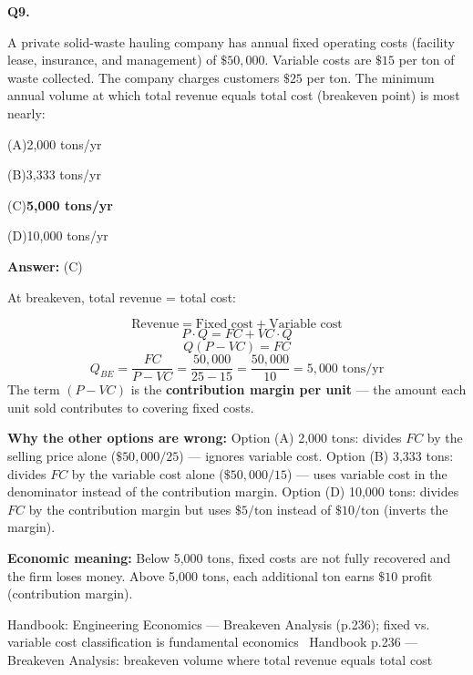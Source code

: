 \documentclass[11pt]{article}
\newcommand{\correct}[1]{\textbf{#1}\;{\color{accent}$\checkmark$}}
\newcommand{\optline}[2]{\par\noindent\hspace{1.2em}(#1)\hspace{0.6em}#2}
\begin{document}
\vspace{9pt}
\filbreak
\textbf{\color{accent}Q9.}\par\vspace{2pt}
A private solid-waste hauling company has annual fixed operating costs (facility lease, insurance, and management) of $\$50{,}000$. Variable costs are $\$15$ per ton of waste collected. The company charges customers $\$25$ per ton. The minimum annual volume at which total revenue equals total cost (breakeven point) is most nearly:\par\par\vspace{3pt}
\optline{A}{2,000 tons/yr}
\optline{B}{3,333 tons/yr}
\optline{C}{\correct{5,000 tons/yr}}
\optline{D}{10,000 tons/yr}
\par\vspace{3pt}
\vspace{2pt}\par\noindent\colorbox{boxbg}{\parbox{\dimexpr\linewidth-2\fboxsep\relax}{%
\vspace{2pt}\textbf{Answer:} (C)\par\vspace{2pt}
{\small At breakeven, total revenue = total cost:\par
\[\text{Revenue} = \text{Fixed cost} + \text{Variable cost}\]
\[P \cdot Q = FC + VC \cdot Q\]
\[Q(P - VC) = FC\]
\[Q_{BE} = \frac{FC}{P - VC} = \frac{50{,}000}{25 - 15} = \frac{50{,}000}{10} = 5{,}000 \text{ tons/yr}\]
The term $(P - VC)$ is the \textbf{contribution margin per unit} --- the amount each unit sold contributes to covering fixed costs.\par
\textbf{Why the other options are wrong:} Option (A) 2,000 tons: divides $FC$ by the selling price alone ($\$50{,}000/25$) --- ignores variable cost. Option (B) 3,333 tons: divides $FC$ by the variable cost alone ($\$50{,}000/15$) --- uses variable cost in the denominator instead of the contribution margin. Option (D) 10,000 tons: divides $FC$ by the contribution margin but uses $\$5/\text{ton}$ instead of $\$10/\text{ton}$ (inverts the margin).\par
\textbf{Economic meaning:} Below 5,000 tons, fixed costs are not fully recovered and the firm loses money. Above 5,000 tons, each additional ton earns $\$10$ profit (contribution margin).\par}\par\vspace{2pt}
{\footnotesize\color{soft}Handbook: Engineering Economics --- Breakeven Analysis (p.236); fixed vs. variable cost classification is fundamental economics \textbullet\ Handbook p.236 --- Breakeven Analysis: breakeven volume where total revenue equals total cost}\vspace{2pt}
}}
\end{document}
